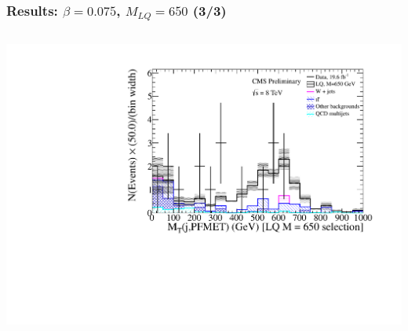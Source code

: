 \documentclass[bigger]{beamer}
\begin{document}
\begin{frame}
\frametitle{Results: $\beta = 0.075$, $M_{LQ} = 650$ (3/3)}
\label{sec-7-2-3}
\begin{columns}
\begin{column}{0.6\textwidth}
\label{sec-7-2-3-1}

\centering
\mtjnu
\includegraphics[width=\textwidth]{fig/enu/finalSelection015/MTjnu_LQ650_enujj.pdf}
\end{column}
\end{columns}
\end{frame}
\end{document}
